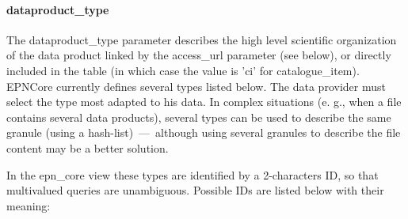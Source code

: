 \documentclass[11pt,a4paper]{ivoa}
\begin{document}
\paragraph{dataproduct\_type}

The dataproduct\_type parameter describes the high level scientific organization of the data product linked by the access\_url parameter (see below), or directly included in the table (in which case the value is 'ci' for catalogue\_item). EPNCore currently defines several types listed below. The data provider must select the type most adapted to his data. In complex situations (e. g., when a file contains several data products), several types can be used to describe the same granule (using a hash-list) — although using several granules to describe the file content may be a better solution.

In the epn\_core view these types are identified by a 2-characters ID, so that multivalued queries are unambiguous. Possible IDs are listed below with their meaning:
\end{document}
